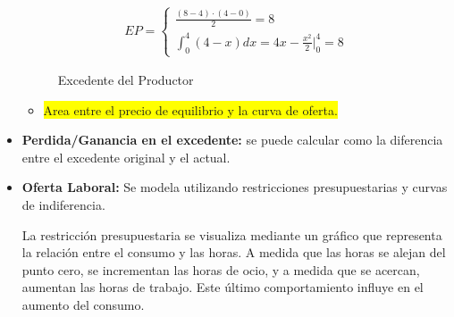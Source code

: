 \documentclass{templateNote}
\newcommand{\destacar}[1]{ \colorbox{yellow}{#1}}
\begin{document}
\begin{itemize}
\begin{figure}[H]
        \caption{Excedente del Productor}
        \begin{align*}
            EP = \begin{cases}
                    \displaystyle \frac{(8 - 4) \cdot (4 - 0)}{2} = 8 \\
                    \displaystyle \int_{0}^{4}{(4-x)}dx = 4x - \frac{x^2}{2} \Big|_{0}^{4} = 8
                \end{cases}
        \end{align*}
    \end{figure}
    \begin{itemize}
        \item \destacar{Area entre el precio de equilibrio y la curva de oferta.}
    \end{itemize}

    \item \textbf{Perdida/Ganancia en el excedente:} se puede calcular como la diferencia entre el
    excedente original y el actual.

    \item \textbf{Oferta Laboral:} Se modela utilizando restricciones presupuestarias y curvas de
    indiferencia.
    
    La restricción presupuestaria se visualiza mediante un gráfico que representa la relación entre el
    consumo y las horas. A medida que las horas se alejan del punto cero, se incrementan las horas
    de ocio, y a medida que se acercan, aumentan las horas de trabajo. Este último comportamiento
    influye en el aumento del consumo.
    

\end{itemize}
\end{document}
